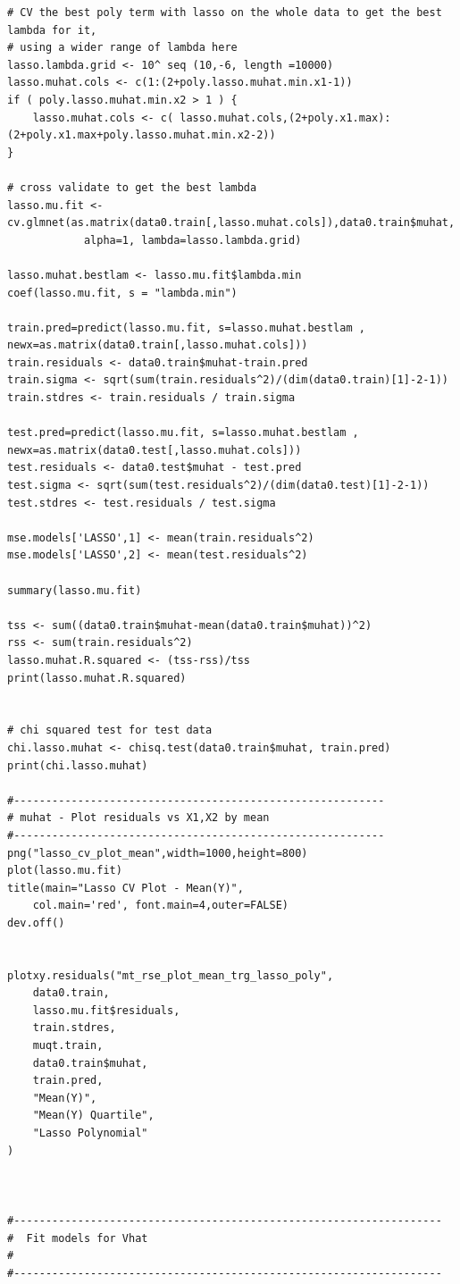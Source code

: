 \documentclass[twoside,12pt]{article}
\begin{document}
\begin{verbatim}
# CV the best poly term with lasso on the whole data to get the best lambda for it, 
# using a wider range of lambda here
lasso.lambda.grid <- 10^ seq (10,-6, length =10000)
lasso.muhat.cols <- c(1:(2+poly.lasso.muhat.min.x1-1))
if ( poly.lasso.muhat.min.x2 > 1 ) {
	lasso.muhat.cols <- c( lasso.muhat.cols,(2+poly.x1.max):(2+poly.x1.max+poly.lasso.muhat.min.x2-2))
}

# cross validate to get the best lambda
lasso.mu.fit <- cv.glmnet(as.matrix(data0.train[,lasso.muhat.cols]),data0.train$muhat,
			alpha=1, lambda=lasso.lambda.grid)

lasso.muhat.bestlam <- lasso.mu.fit$lambda.min
coef(lasso.mu.fit, s = "lambda.min")

train.pred=predict(lasso.mu.fit, s=lasso.muhat.bestlam , newx=as.matrix(data0.train[,lasso.muhat.cols]))
train.residuals <- data0.train$muhat-train.pred
train.sigma <- sqrt(sum(train.residuals^2)/(dim(data0.train)[1]-2-1))
train.stdres <- train.residuals / train.sigma

test.pred=predict(lasso.mu.fit, s=lasso.muhat.bestlam , newx=as.matrix(data0.test[,lasso.muhat.cols]))
test.residuals <- data0.test$muhat - test.pred
test.sigma <- sqrt(sum(test.residuals^2)/(dim(data0.test)[1]-2-1))
test.stdres <- test.residuals / test.sigma

mse.models['LASSO',1] <- mean(train.residuals^2)
mse.models['LASSO',2] <- mean(test.residuals^2)

summary(lasso.mu.fit)

tss <- sum((data0.train$muhat-mean(data0.train$muhat))^2)
rss <- sum(train.residuals^2)
lasso.muhat.R.squared <- (tss-rss)/tss
print(lasso.muhat.R.squared)


# chi squared test for test data
chi.lasso.muhat <- chisq.test(data0.train$muhat, train.pred)
print(chi.lasso.muhat)

#----------------------------------------------------------
# muhat - Plot residuals vs X1,X2 by mean
#----------------------------------------------------------
png("lasso_cv_plot_mean",width=1000,height=800)
plot(lasso.mu.fit)
title(main="Lasso CV Plot - Mean(Y)",
	col.main='red', font.main=4,outer=FALSE)
dev.off()


plotxy.residuals("mt_rse_plot_mean_trg_lasso_poly",
	data0.train,
	lasso.mu.fit$residuals,
	train.stdres,
	muqt.train,
	data0.train$muhat,
	train.pred,
	"Mean(Y)",
	"Mean(Y) Quartile",
	"Lasso Polynomial"
)



#-------------------------------------------------------------------
#  Fit models for Vhat
#
#-------------------------------------------------------------------




\end{verbatim}
\end{document}
